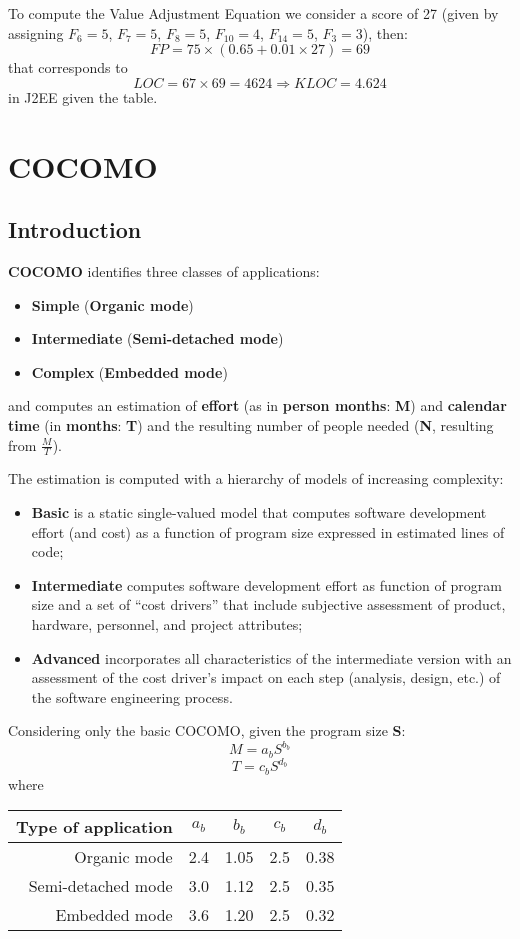 \documentclass[a4paper,12pt]{book}
\begin{document}
To compute the Value Adjustment Equation we consider a score of 27 (given by assigning $F_6 = 5$, $F_7 = 5$, $F_8 = 5$, $F_{10} = 4$, $F_{14} = 5$, $F_3 = 3$), then:
\[
  FP = 75 \times (0.65 + 0.01 \times 27) = 69
\]
that corresponds to
\[
  LOC = 67 \times 69 = 4624 \Longrightarrow KLOC = 4.624
\]
in J2EE given the table.

\section{COCOMO}

\subsection{Introduction}
\textbf{COCOMO} identifies three classes of applications:
\begin{itemize}
  \item \textbf{Simple} (\textbf{Organic mode})
  \item \textbf{Intermediate} (\textbf{Semi-detached mode})
  \item \textbf{Complex} (\textbf{Embedded mode})
\end{itemize}
and computes an estimation of \textbf{effort} (as in \textbf{person months}: \textbf{M}) and \textbf{calendar time} (in \textbf{months}: \textbf{T}) and the resulting number of people needed (\textbf{N}, resulting from $\frac{M}{T}$).

The estimation is computed with a hierarchy of models of increasing complexity:
\begin{itemize}
  \item \textbf{Basic} is a static single-valued model that computes software development effort (and cost) as a function of program size expressed in estimated lines of code;
  \item \textbf{Intermediate} computes software development effort as function of program size and a set of ``cost drivers'' that include subjective assessment of product, hardware, personnel, and project attributes;
  \item \textbf{Advanced} incorporates all characteristics of the intermediate version with an assessment of the cost driver's impact on each step (analysis, design, etc.) of the software engineering process.
\end{itemize}

Considering only the basic COCOMO, given the program size \textbf{S}:
  \[
    M = a_b S^{b_b}
  \]
  \[
    T = c_b S^{d_b}
  \]
  where
  \begin{center}
  \begin{tabular}{ | r | c | c | c | c |}
    \hline
    \textbf{Type of application} & $a_b$ & $b_b$ & $c_b$ & $d_b$ \\ \hline 
    Organic mode & 2.4 & 1.05 & 2.5 & 0.38 \\ \hline
    Semi-detached mode & 3.0 & 1.12 & 2.5 & 0.35 \\ \hline
    Embedded mode & 3.6 & 1.20 & 2.5 & 0.32 \\ \hline
   \end{tabular}
\end{center}
\end{document}
